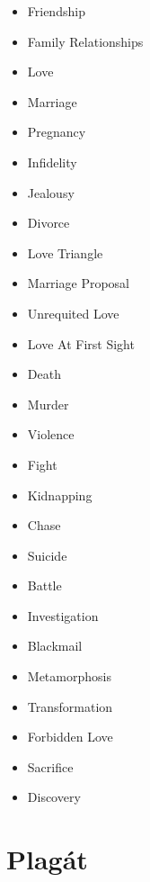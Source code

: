 \begin{minipage}[t]{.5\textwidth}
       \begin{itemize}
        \item Friendship
        \item Family Relationships
        \item Love
        \item Marriage
        \item Pregnancy
        \item Infidelity
        \item Jealousy
        \item Divorce
        \item Love Triangle
        \item Marriage Proposal
        \item Unrequited Love  
        \item Love At First Sight
        \item Death
        \item Murder
        \item Violence
        \item Fight
        \item Kidnapping
        \item Chase
        \item Suicide
        \item Battle
        \item Investigation
        \item Blackmail
        \item Metamorphosis
        \item Transformation
        \item Forbidden Love
        \item Sacrifice
        \item Discovery
    \end{itemize}
\end{minipage}




\chapter{Plagát}

